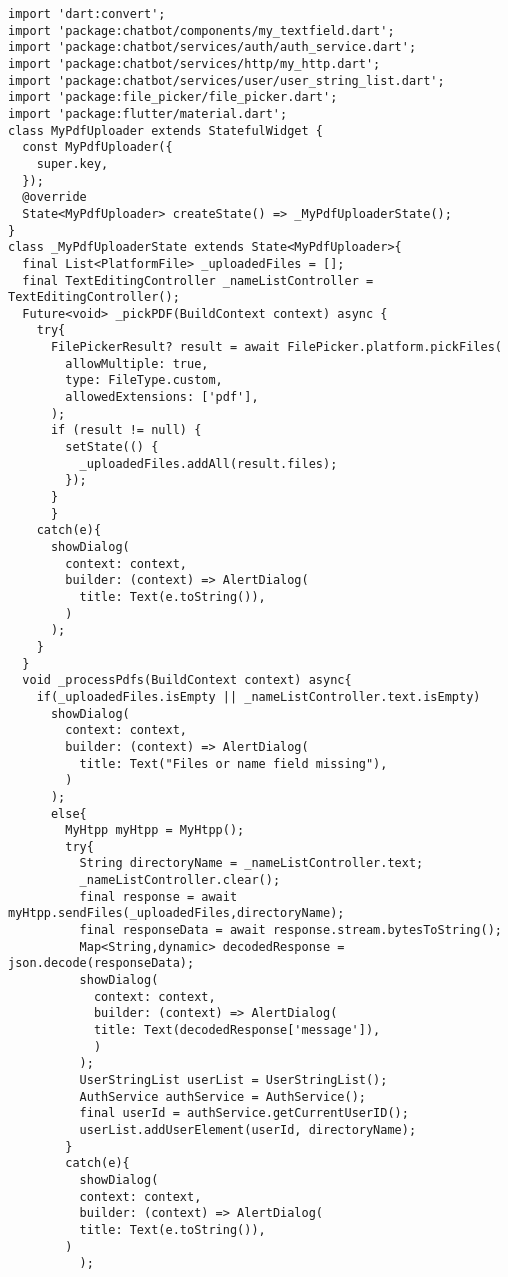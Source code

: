 \begin{lstlisting}[style=pythonstyle,caption={Codice del my\_pdf\_uploader.dart}, label={lst:MyPdfUploader}]
import 'dart:convert';
import 'package:chatbot/components/my_textfield.dart';
import 'package:chatbot/services/auth/auth_service.dart';
import 'package:chatbot/services/http/my_http.dart';
import 'package:chatbot/services/user/user_string_list.dart';
import 'package:file_picker/file_picker.dart';
import 'package:flutter/material.dart';
class MyPdfUploader extends StatefulWidget {
  const MyPdfUploader({
    super.key,
  });
  @override
  State<MyPdfUploader> createState() => _MyPdfUploaderState(); 
}
class _MyPdfUploaderState extends State<MyPdfUploader>{
  final List<PlatformFile> _uploadedFiles = [];
  final TextEditingController _nameListController = TextEditingController();
  Future<void> _pickPDF(BuildContext context) async {
    try{
      FilePickerResult? result = await FilePicker.platform.pickFiles(
        allowMultiple: true,
        type: FileType.custom,
        allowedExtensions: ['pdf'],
      );
      if (result != null) {
        setState(() {
          _uploadedFiles.addAll(result.files);
        });
      }
      }
    catch(e){
      showDialog(
        context: context, 
        builder: (context) => AlertDialog(
          title: Text(e.toString()),
        )
      );
    }
  }
  void _processPdfs(BuildContext context) async{
    if(_uploadedFiles.isEmpty || _nameListController.text.isEmpty)
      showDialog(
        context: context, 
        builder: (context) => AlertDialog(
          title: Text("Files or name field missing"),
        )
      );
      else{
        MyHtpp myHtpp = MyHtpp();
        try{
          String directoryName = _nameListController.text;
          _nameListController.clear();
          final response = await myHtpp.sendFiles(_uploadedFiles,directoryName);
          final responseData = await response.stream.bytesToString();
          Map<String,dynamic> decodedResponse = json.decode(responseData);
          showDialog(
            context: context, 
            builder: (context) => AlertDialog(
            title: Text(decodedResponse['message']),
            )
          );
          UserStringList userList = UserStringList();
          AuthService authService = AuthService();
          final userId = authService.getCurrentUserID();
          userList.addUserElement(userId, directoryName);
        }
        catch(e){
          showDialog(
          context: context, 
          builder: (context) => AlertDialog(
          title: Text(e.toString()),
        )
          );

\end{lstlisting}
